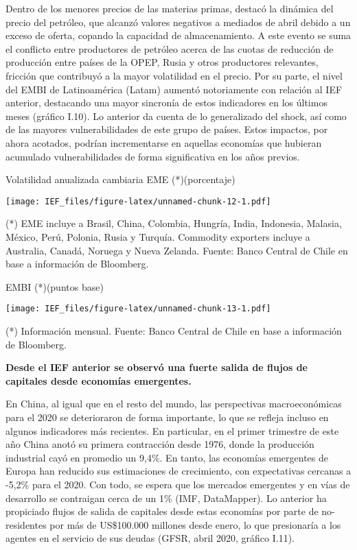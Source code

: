 \documentclass[
]{book}
\begin{document}
Dentro de los menores precios de las materias primas, destacó la dinámica del
precio del petróleo, que alcanzó valores negativos a mediados de abril debido a
un exceso de oferta, copando la capacidad de almacenamiento. A este evento
se suma el conflicto entre productores de petróleo acerca de las cuotas de
reducción de producción entre países de la OPEP, Rusia y otros productores
relevantes, fricción que contribuyó a la mayor volatilidad en el precio. Por su
parte, el nivel del EMBI de Latinoamérica (Latam) aumentó notoriamente con
relación al IEF anterior, destacando una mayor sincronía de estos indicadores
en los últimos meses (gráfico I.10). Lo anterior da cuenta de lo generalizado del
shock, así como de las mayores vulnerabilidades de este grupo de países. Estos
impactos, por ahora acotados, podrían incrementarse en aquellas economías
que hubieran acumulado vulnerabilidades de forma significativa en los años
previos.

Volatilidad anualizada cambiaria EME (*)(porcentaje)

\texttt{[image: IEF\_files/figure-latex/unnamed-chunk-12-1.pdf]}

(*) EME incluye a Brasil, China, Colombia, Hungría, India, Indonesia, Malasia, México, Perú, Polonia, Rusia y Turquía. Commodity exporters incluye a Australia, Canadá, Noruega y Nueva Zelanda.
Fuente: Banco Central de Chile en base a información de Bloomberg.

EMBI (*)(puntos base)

\texttt{[image: IEF\_files/figure-latex/unnamed-chunk-13-1.pdf]}

(*) Información mensual.
Fuente: Banco Central de Chile en base a información de Bloomberg.

\textbf{Desde el IEF anterior se observó una fuerte salida de flujos de capitales desde economías emergentes.}

En China, al igual que en el resto del mundo, las perspectivas macroeconómicas
para el 2020 se deterioraron de forma importante, lo que se refleja incluso
en algunos indicadores más recientes. En particular, en el primer trimestre de
este año China anotó su primera contracción desde 1976, donde la producción
industrial cayó en promedio un 9,4\%. En tanto, las economías emergentes de
Europa han reducido sus estimaciones de crecimiento, con expectativas cercanas
a -5,2\% para el 2020. Con todo, se espera que los mercados emergentes y en
vías de desarrollo se contraigan cerca de un 1\% (IMF, DataMapper). Lo anterior
ha propiciado flujos de salida de capitales desde estas economías por parte de
no-residentes por más de US\$100.000 millones desde enero, lo que presionaría
a los agentes en el servicio de sus deudas (GFSR, abril 2020, gráfico I.11).
\end{document}
